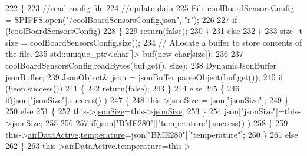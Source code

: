 \begin{DoxyCode}
222 \{
223     \textcolor{comment}{//read config file}
224     \textcolor{comment}{//update data}
225     File coolBoardSensorsConfig = SPIFFS.open(\textcolor{stringliteral}{"/coolBoardSensorsConfig.json"}, \textcolor{stringliteral}{"r"});
226 
227     \textcolor{keywordflow}{if} (!coolBoardSensorsConfig) 
228     \{
229         \textcolor{keywordflow}{return}(\textcolor{keyword}{false});
230     \}
231     \textcolor{keywordflow}{else}
232     \{
233         \textcolor{keywordtype}{size\_t} size = coolBoardSensorsConfig.size();
234         \textcolor{comment}{// Allocate a buffer to store contents of the file.}
235         std::unique\_ptr<char[]> buf(\textcolor{keyword}{new} \textcolor{keywordtype}{char}[size]);
236 
237         coolBoardSensorsConfig.readBytes(buf.get(), size);
238         DynamicJsonBuffer jsonBuffer;
239         JsonObject& json = jsonBuffer.parseObject(buf.get());
240         \textcolor{keywordflow}{if} (!json.success()) 
241         \{
242               \textcolor{keywordflow}{return}(\textcolor{keyword}{false});
243         \} 
244         \textcolor{keywordflow}{else}
245         \{     
246             \textcolor{keywordflow}{if}(json[\textcolor{stringliteral}{"jsonSize"}].success() )
247             \{
248                 this->\hyperlink{classCoolBoardSensors_a05a40dc80bfff14ffb830f549b876f8d}{jsonSize} = json[\textcolor{stringliteral}{"jsonSize"}]; 
249             \}
250             \textcolor{keywordflow}{else}
251             \{
252                 this->\hyperlink{classCoolBoardSensors_a05a40dc80bfff14ffb830f549b876f8d}{jsonSize}=this->\hyperlink{classCoolBoardSensors_a05a40dc80bfff14ffb830f549b876f8d}{jsonSize};          
253             \}
254             json[\textcolor{stringliteral}{"jsonSize"}]=this->\hyperlink{classCoolBoardSensors_a05a40dc80bfff14ffb830f549b876f8d}{jsonSize};
255 
256             
257             \textcolor{keywordflow}{if}(json[\textcolor{stringliteral}{"BME280"}][\textcolor{stringliteral}{"temperature"}].success() )
258             \{           
259                 this->\hyperlink{classCoolBoardSensors_abff8dfeccb2f7689847bb64d5f1cd31e}{airDataActive}.\hyperlink{structCoolBoardSensors_1_1airActive_a9a6633c426b0508e30ebc1832ec6d745}{temperature}=json[\textcolor{stringliteral}{"BME280"}][\textcolor{stringliteral}{"temperature"}];
260             \}
261             \textcolor{keywordflow}{else}
262             \{
263                 this->\hyperlink{classCoolBoardSensors_abff8dfeccb2f7689847bb64d5f1cd31e}{airDataActive}.\hyperlink{structCoolBoardSensors_1_1airActive_a9a6633c426b0508e30ebc1832ec6d745}{temperature}=this->

\end{DoxyCode}
